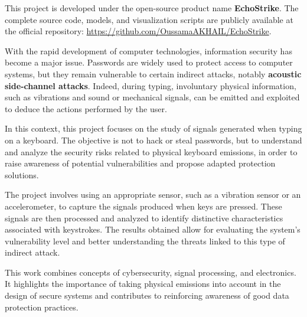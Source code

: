 \documentclass[12pt,a4paper]{article}
\begin{document}
This project is developed under the open-source product name \textbf{EchoStrike}. The complete source code, models, and visualization scripts are publicly available at the official repository: \url{https://github.com/OussamaAKHAIL/EchoStrike}.

With the rapid development of computer technologies, information security has become a major issue. Passwords are widely used to protect access to computer systems, but they remain vulnerable to certain indirect attacks, notably \textbf{acoustic side-channel attacks}. Indeed, during typing, involuntary physical information, such as vibrations and sound or mechanical signals, can be emitted and exploited to deduce the actions performed by the user.

In this context, this project focuses on the study of signals generated when typing on a keyboard. The objective is not to hack or steal passwords, but to understand and analyze the security risks related to physical keyboard emissions, in order to raise awareness of potential vulnerabilities and propose adapted protection solutions.

The project involves using an appropriate sensor, such as a vibration sensor or an accelerometer, to capture the signals produced when keys are pressed. These signals are then processed and analyzed to identify distinctive characteristics associated with keystrokes. The results obtained allow for evaluating the system's vulnerability level and better understanding the threats linked to this type of indirect attack.

This work combines concepts of cybersecurity, signal processing, and electronics. It highlights the importance of taking physical emissions into account in the design of secure systems and contributes to reinforcing awareness of good data protection practices.
\end{document}
